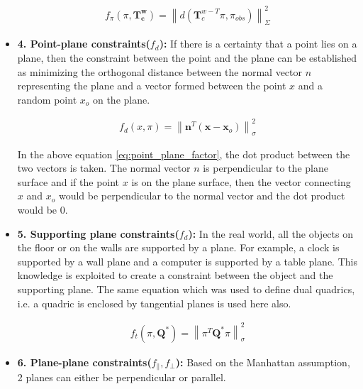 \documentclass[report.tex]{subfiles}
\begin{document}
\begin{itemize}
\begin{equation}
{
\begin{aligned}
f_{\pi}\left(\pi, \mathbf{T}_{\mathbf{c}}^{\mathbf{w}}\right)=\left\|d\left(\mathbf{T}_{c}^{w-T} \pi, \pi_{o b s}\right)\right\|_{\Sigma}^{2}
\end{aligned}
} \label{eq:plane_factor}
\end{equation}

\item \textbf{4. Point-plane constraints($f_{d}$): } If there is a certainty that a point lies on a plane, then the constraint between the point and the plane can be established as minimizing the orthogonal distance between the normal vector $n$ representing the plane and a vector formed between the point $x$ and a random point $x_o$ on the plane.

\begin{equation}
{
\begin{aligned}
f_{d}(x, \pi)=\left\|\mathbf{n}^{T}\left(\mathbf{x}-\mathbf{x}_{o}\right)\right\|_{\sigma}^{2}
\end{aligned}
} \label{eq:point_plane_factor}
\end{equation}

In the above equation \ref{eq:point_plane_factor}, the dot product between the two vectors is taken. The normal vector $n$ is perpendicular to the plane surface and if the point $x$ is on the plane surface, then the vector connecting $x$ and $x_o$ would be perpendicular to the normal vector and the dot product would be 0.

\item \textbf{5. Supporting plane constraints($f_{d}$): } In the real world, all the objects on the floor or on the walls are supported by a plane. For example, a clock is supported by a wall plane and a computer is supported by a table plane. This knowledge is exploited to create a constraint between the object and the supporting plane. The same equation which was used to define dual quadrics, i.e. a quadric is enclosed by tangential planes is used here also.

\begin{equation}
{
\begin{aligned}
f_{t}\left(\pi, \mathbf{Q}^{*}\right)=\left\|\pi^{T} \mathbf{Q}^{*} \pi\right\|_{\sigma}^{2}
\end{aligned}
} \label{eq:support_plane_factor}
\end{equation}


\item \textbf{6. Plane-plane constraints($f_{\|}, f_{\perp}$): } Based on the Manhattan assumption, 2 planes can either be perpendicular or parallel.


\end{itemize}
\end{document}
